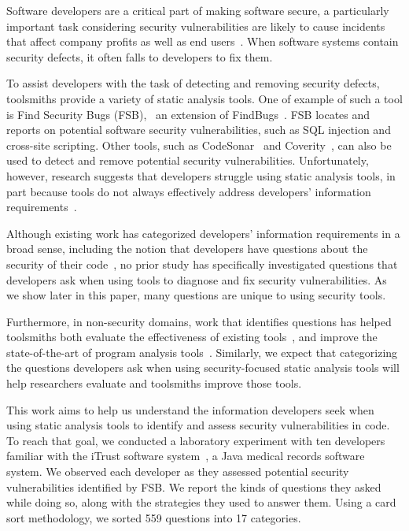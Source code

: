 \documentclass{acm_proc_article-sp}
\begin{document}
Software developers are a critical part of making software secure, a particularly important task considering security vulnerabilities are likely to cause incidents that affect company profits as well as end users~\cite{chen2002mops}.
When software systems contain security defects, it often falls to developers to fix them. 

To assist developers with the task of detecting and removing security defects, toolsmiths provide a variety of static analysis tools.
One of example of such a tool is Find Security Bugs (FSB),~\cite{FindSecurityBugs} an extension of FindBugs~\cite{FindBugs}.
FSB locates and reports on potential software security vulnerabilities, such as SQL injection and cross-site scripting.  
Other tools, such as CodeSonar~\cite{CodeSonar} and Coverity~\cite{Coverity}, can also be used to detect and remove potential security vulnerabilities.
Unfortunately, however, research suggests that developers struggle using static analysis tools, in part because tools do not always effectively address developers' information requirements~\cite{johnson2013don}. 


Although existing work has categorized developers' information requirements in a broad sense, including the notion that developers have questions about the security of their code~\cite{latoza2010hard}, no prior study has specifically investigated questions that developers ask when using tools to diagnose and fix security vulnerabilities. 
As we show later in this paper, many questions are unique to using security tools.

Furthermore, in non-security domains, work that identifies questions has helped toolsmiths both evaluate the effectiveness of existing tools~\cite{ammar2012empirical}, and improve the state-of-the-art of program analysis tools~\cite{kononenko2012automatically, servant2012history, yoon2013visualization}. 
Similarly, we expect that categorizing the questions developers ask when using security-focused static analysis tools will help researchers evaluate and toolsmiths improve those tools. 


This work aims to help us understand the information developers seek when using static analysis tools to identify and assess security vulnerabilities in code.
To reach that goal, we conducted a laboratory experiment with ten developers familiar with the iTrust software system~\cite{iTrust}, a Java medical records software system.
We observed each developer as they assessed potential security vulnerabilities identified by FSB. 
We report the kinds of questions they asked while doing so, along with the strategies they used to answer them.
Using a card sort methodology, we sorted 559 questions into 17 categories. 
\end{document}
